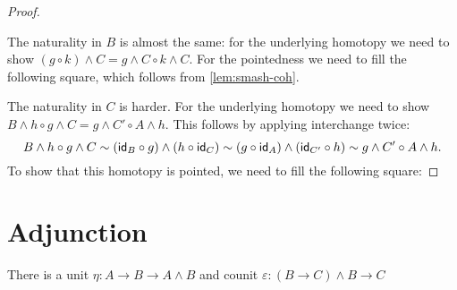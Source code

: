 \documentclass{article}
\newcommand{\pmap}{\to}
\renewcommand{\smash}{\wedge}
\renewcommand{\epsilon}{\varepsilon}
\renewcommand{\o}{\ensuremath{\circ}}
\begin{document}
\begin{proof}
\begin{center}
\end{center}
The naturality in $B$ is almost the same: for the underlying homotopy we need to show
$(g \o k)\smash C = g\smash C \o k\smash C$. For the pointedness we need to fill the following
square, which follows from \autoref{lem:smash-coh}.
\begin{center}
\end{center}
The naturality in $C$ is harder. For the underlying homotopy we need to show
$B\smash h\o g\smash C=g\smash C'\o A\smash h$. This follows by applying interchange twice:
$$B\smash h\o g\smash C\sim(\idfunc[B]\o g)\smash(h\o\idfunc[C])\sim(g\o\idfunc[A])\smash(\idfunc[C']\o h)\sim g\smash C'\o A\smash h.$$
To show that this homotopy is pointed, we need to fill the following square:

\end{proof}

\section{Adjunction}

\begin{defn}
There is a unit $\eta:A\pmap B\pmap A\smash B$ and counit $\epsilon : (B\pmap C)\smash B \pmap C$
\end{defn}
\end{document}
